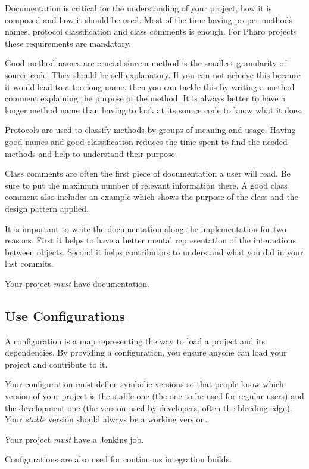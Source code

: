 \documentclass[10pt]{article}
\begin{document}
Documentation is critical for the understanding of your project, how it is composed and how it should be used. Most of the time having proper methods names, protocol classification and class comments is enough. For Pharo projects these requirements are mandatory.

Good method names are crucial since a method is the smallest granularity of source code.
They should be self-explanatory. If you can not achieve this because it would lead to a too long name, then you can tackle this by writing a method comment explaining the purpose of the method. It is always better to have a longer method name than having to look at its source code to know what it does.

Protocols are used to classify methods by groups of meaning and usage. Having good names and good classification reduces the time spent to find the needed methods and help to understand their purpose.

Class comments are often the first piece of documentation a user will read. Be sure to put the maximum number of relevant information there. A good class comment also includes an example which shows the purpose of the class and the design pattern applied.

It is important to write the documentation along the implementation for two reasons. First it helps to have a better mental representation of the interactions between objects. Second it helps contributors to understand what you did in your last commits.

Your project \emph{must} have documentation.

\subsection{Use Configurations}\label{subsec:configurations}

A configuration is a map representing the way to load a project and its dependencies.
By providing a configuration, you ensure anyone can load your project and contribute to it.

Your configuration must define symbolic versions so that people know which version of your project is the stable one (the one to be used for regular users) and the development one (the version used by developers, often the bleeding edge). Your \emph{stable} version should always be a working version.

Your project \emph{must} have a Jenkins job.

Configurations are also used for continuous integration builds.
\end{document}

